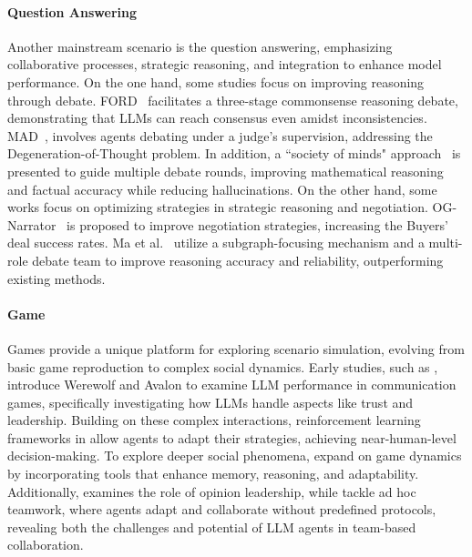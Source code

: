 \paragraph{Question Answering}
Another mainstream scenario is the question answering, emphasizing collaborative processes, strategic reasoning, and integration to enhance model performance. On the one hand, some studies focus on improving reasoning through debate. FORD~\cite{xiong2023examining} facilitates a three-stage commonsense reasoning debate, demonstrating that LLMs can reach consensus even amidst inconsistencies. MAD~\cite{du2023improving}, involves agents debating under a judge's supervision, addressing the Degeneration-of-Thought problem. In addition, a ``society of minds" approach~\cite{du2023improving} is presented to guide multiple debate rounds, improving mathematical reasoning and factual accuracy while reducing hallucinations. On the other hand, some works focus on optimizing strategies in strategic reasoning and negotiation. OG-Narrator~\cite{xia2024measuring} is proposed to improve negotiation strategies, increasing the Buyers' deal success rates. Ma et al.~\cite{ma2024debate} utilize a subgraph-focusing mechanism and a multi-role debate team to improve reasoning accuracy and reliability, outperforming existing methods.

\paragraph{Game}
Games provide a unique platform for exploring scenario simulation, evolving from basic game reproduction to complex social dynamics.
Early studies, such as \cite{xu2023exploring,wang2023avalon}, introduce Werewolf and Avalon to examine LLM performance in communication games, specifically investigating how LLMs handle aspects like trust and leadership. 
Building on these complex interactions, reinforcement learning frameworks in \cite{xu2023language,wu2024enhance} allow agents to adapt their strategies, achieving near-human-level decision-making.
To explore deeper social phenomena, \cite{wu2024enhance,zhu2024player} expand on game dynamics by incorporating tools that enhance memory, reasoning, and adaptability. 
Additionally, \cite{du2024helmsman} examines the role of opinion leadership, while \cite{wu2023deciphering,shi2023cooperation,gong2023mindagent} tackle ad hoc teamwork, where agents adapt and collaborate without predefined protocols, revealing both the challenges and potential of LLM agents in team-based collaboration.

